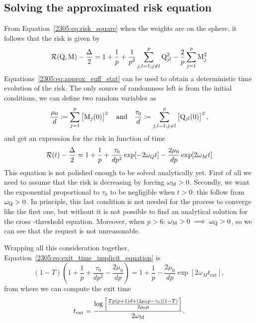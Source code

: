 \subsection{Solving the approximated risk equation}
From Equation~\eqref{2305:eq:risk_square} when the weights are on the sphere, it follows that the risk is given by
\begin{equation}
  \mathcal{R}{(\mathrm{Q},\mathrm{M})}-\frac\Delta2 = 1 + \frac1p + \frac{1}{p^2}\sum_{j,l=1;j\neq l}^p \mathrm{Q}^2_{jl} - \frac2p \sum_{j=1}^p \mathrm{M}^2_{j}
\end{equation}
Equations~\eqref{2305:eq:approx_suff_stat} can be used to obtain a deterministic time evolution of the risk. The only source of randomness left is from the initial conditions, we can define two random variables as
\begin{equation}
    \frac{\mu_0}{d} \coloneqq \sum_{j=1}^p \left[\mathrm{M}_{j}(0)\right]^2 \quad\text{and}\quad
    \frac{\tau_0}{d} \coloneqq \sum_{j,l=1;j\neq l}^p \left[\mathrm{Q}_{jl}(0)\right]^2,
\end{equation}
and get an expression for the risk in function of time
\begin{equation}
    \mathcal{R}(t)-\frac\Delta2 = 1+\frac1p+\frac{\tau_0}{dp^2}\exp[-2\omega_Q t]-\frac{2\mu_0}{dp}\exp[2\omega_M t]
\end{equation}
This equation is not polished enough to be solved analytically yet. First of all we need to assume that the risk is decreasing by forcing
\(\omega_{\mathrm{M}} > 0\). Secondly, we want the exponential proportional to \(\tau_0\) to be negligible when \(t>0\): this follow from \(\omega_{\mathrm{Q}}>0\).
In principle, this last condition is not needed for the process to converge like the first one, but without it is not possible to find an analytical solution for the cross -threshold equation. Moreover, when \(p>6\): \(\omega_{\mathrm{M}}>0 \implies \omega_{\mathrm{Q}}>0\), so we can see that the request is not unreasonable.

Wrapping all this consideration together, Equation~\eqref{2305:eq:exit_time_implicit_equation} is
\begin{equation}
    (1-T)\left(1+\frac1p+\frac{\tau_0}{dp^2}-\frac{2\mu_0}{dp}\right) = 1+\frac1p-\frac{2\mu_0}{dp}\exp[2\omega_M t_\text{ext}],
\end{equation}
from where we can compute the exit time
\[
t_\text{ext} = \frac{\log\left[\frac{Tp(p+1)d+(2\mu_0p-\tau_0)(1-T)}{2\mu_0 p}\right]}{2\omega_{\mathrm{M}}}.
\]
